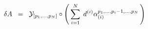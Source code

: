 \begin{equation}
\delta A \;\; = \;\; {\cal{Y}}_{[ p_1 ,..., p_N ]} \circ \left( \,
\sum^N_{i=1}\; d^{(i)} \alpha_{(i)}^{p_1 ,...,p_i -1 ,...,p_N } \,
\right)
\label{eq:4.16}
\end{equation}

